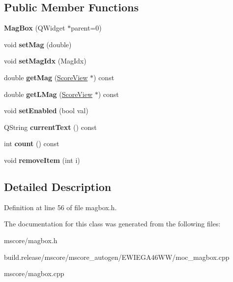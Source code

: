 \subsection*{Public Member Functions}
\begin{DoxyCompactItemize}
\item 
\mbox{\label{class_ms_1_1_mag_box_ae61e3178f20fac37d56d84ccb502d1c2}} 
{\bfseries Mag\+Box} (Q\+Widget $\ast$parent=0)
\item 
\mbox{\label{class_ms_1_1_mag_box_a4e09d3a9e6a22677e027346adf3d70c6}} 
void {\bfseries set\+Mag} (double)
\item 
\mbox{\label{class_ms_1_1_mag_box_a294a0b1c57f46092035d5abf983164b5}} 
void {\bfseries set\+Mag\+Idx} (Mag\+Idx)
\item 
\mbox{\label{class_ms_1_1_mag_box_a2ebefdca6db0ada73bace04c3360f2a2}} 
double {\bfseries get\+Mag} (\hyperlink{class_ms_1_1_score_view}{Score\+View} $\ast$) const
\item 
\mbox{\label{class_ms_1_1_mag_box_ab02c0ea531c0601a3492351675c6305f}} 
double {\bfseries get\+L\+Mag} (\hyperlink{class_ms_1_1_score_view}{Score\+View} $\ast$) const
\item 
\mbox{\label{class_ms_1_1_mag_box_a64eedbd58e93d428358d70927a7f1a05}} 
void {\bfseries set\+Enabled} (bool val)
\item 
\mbox{\label{class_ms_1_1_mag_box_a54b70a0edda21b3bc1c9867944ac1f95}} 
Q\+String {\bfseries current\+Text} () const
\item 
\mbox{\label{class_ms_1_1_mag_box_a2839d0e39ca2d778a9856897c3fb19ed}} 
int {\bfseries count} () const
\item 
\mbox{\label{class_ms_1_1_mag_box_a844b2d93f00a33cbc332e33f2e56f454}} 
void {\bfseries remove\+Item} (int i)
\end{DoxyCompactItemize}


\subsection{Detailed Description}


Definition at line 56 of file magbox.\+h.



The documentation for this class was generated from the following files\+:\begin{DoxyCompactItemize}
\item 
mscore/magbox.\+h\item 
build.\+release/mscore/mscore\+\_\+autogen/\+E\+W\+I\+E\+G\+A46\+W\+W/moc\+\_\+magbox.\+cpp\item 
mscore/magbox.\+cpp\end{DoxyCompactItemize}
